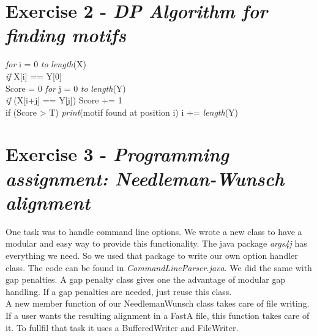 \documentclass[%
   10pt,              %
   ngerman,           %
   a4paper,           %
   DIV11,             %
]{scrartcl}%
\begin{document}
  \section*{Exercise 2 - \textsl{DP Algorithm for finding motifs}}
  \emph{for} i = 0 \emph{to} \emph{length}(X)\\
  \indent \emph{if} X[i] == Y[0]\\
  \indent \indent Score = 0
  \indent \indent \emph{for} j = 0 \emph{to} \emph{length}(Y)\\
  \indent \indent \indent \emph{if} (X[i+j] == Y[j]) Score += 1\\
  \indent \indent if (Score > T) 
  \indent \indent \indent \emph{print}(motif found at position i)
  \indent \indent \indent i += \emph{length}(Y)
 
  \section*{Exercise 3 - \textsl{Programming assignment: Needleman-Wunsch alignment}}
  One task was to handle command line options. We wrote a new class to have a modular 
  and easy way to provide this functionality. The java package \textit{args4j} has everything
  we need. So we used that package to write our own option handler class. The code can 
  be found in \textit{CommandLineParser.java}. We did the same with gap penalties. A
  gap penalty class gives one the advantage of modular gap handling. If a gap penalties are
  needed, just reuse this class.\\
  A new member function of our NeedlemanWunsch class takes care of file writing. If a user 
  wants the resulting alignment in a FastA file, this function takes care of it. To fullfil 
  that task it uses a BufferedWriter and FileWriter. 
\end{document}
